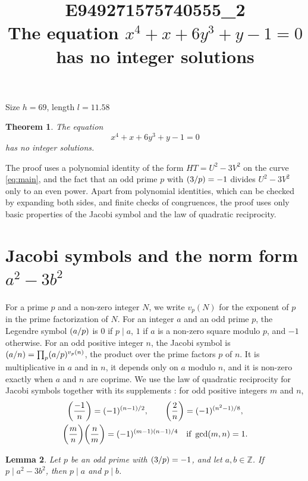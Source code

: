 \documentclass[11pt]{article}
\title{\textbf{E949271575740555\_2}\\[4pt] {\Large The equation $x^{4}+x+6y^{3}+y-1=0$ has no integer solutions}}
\author{}
\date{}
\newtheorem{theorem}{Theorem}
\newtheorem{lemma}[theorem]{Lemma}
\newcommand{\Z}{\mathbb{Z}}
\newcommand{\leg}[2]{\mathchoice{\biggl(\dfrac{#1}{#2}\biggr)}{(#1/#2)}{(#1/#2)}{(#1/#2)}}
\begin{document}
\maketitle
\vspace{-8ex}
\begin{center}
Size $h=69$, length $l=11.58$
\end{center}

\begin{theorem}\label{thm:main}
The equation
\begin{equation}\label{eq:main}
x^{4}+x+6y^{3}+y-1=0
\end{equation}
has no integer solutions.
\end{theorem}

The proof uses a polynomial identity of the form $HT=U^2-3V^2$ on the curve \eqref{eq:main}, and the fact that an odd prime $p$ with $\leg{3}{p}=-1$ divides $U^2-3V^2$ only to an even power. Apart from polynomial identities, which can be checked by expanding both sides, and finite checks of congruences, the proof uses only basic properties of the Jacobi symbol and the law of quadratic reciprocity.

\section{\texorpdfstring{Jacobi symbols and the norm form $a^2-3b^2$}{Jacobi symbols and the norm form}}

For a prime $p$ and a non-zero integer $N$, we write $v_p(N)$ for the exponent of $p$ in the prime factorization of $N$. For an integer $a$ and an odd prime $p$, the Legendre symbol $\leg{a}{p}$ is $0$ if $p\mid a$, $1$ if $a$ is a non-zero square modulo $p$, and $-1$ otherwise. For an odd positive integer $n$, the Jacobi symbol is $\leg{a}{n}=\prod_p\leg{a}{p}^{v_p(n)}$, the product over the prime factors $p$ of $n$. It is multiplicative in $a$ and in $n$, it depends only on $a$ modulo $n$, and it is non-zero exactly when $a$ and $n$ are coprime. We use the law of quadratic reciprocity for Jacobi symbols together with its supplements \cite[Chapter~5, \S2]{IR}: for odd positive integers $m$ and $n$,
\begin{gather*}
\leg{-1}{n}=(-1)^{(n-1)/2},\qquad\leg{2}{n}=(-1)^{(n^2-1)/8},\\
\leg{m}{n}\leg{n}{m}=(-1)^{(m-1)(n-1)/4}\quad\text{if }\gcd(m,n)=1.
\end{gather*}

\begin{lemma}\label{lem:divides}
Let $p$ be an odd prime with $\leg{3}{p}=-1$, and let $a,b\in\Z$. If $p\mid a^2-3b^2$, then $p\mid a$ and $p\mid b$.
\end{lemma}
\end{document}
